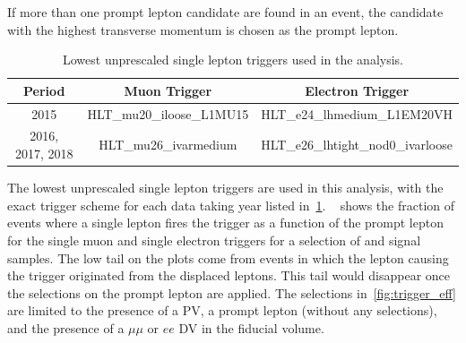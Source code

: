 \begin{table}[!ht]
    \centering
    \caption{Selections used for the prompt lepton candidate.}
    \label{tab:plep_selection}
\end{table}

If more than one prompt lepton candidate are found in an event, the candidate with the highest transverse momentum is chosen as the prompt lepton.

\begin{table}[!ht]
    \centering
    \begin{tabular}{ccc}
        \hline\hline
        Period & Muon Trigger & Electron Trigger \\
        \hline
        2015 & HLT\_mu20\_iloose\_L1MU15 & HLT\_e24\_lhmedium\_L1EM20VH \\
        2016, 2017, 2018 & HLT\_mu26\_ivarmedium & HLT\_e26\_lhtight\_nod0\_ivarloose \\
        \hline\hline
    \end{tabular}
    \caption{Lowest unprescaled single lepton triggers used in the analysis.}
    \label{tab:triggers}
\end{table}

The lowest unprescaled single lepton triggers are used in this analysis, with the exact trigger scheme for each data taking year listed in~\cref{tab:triggers}. ~ shows the fraction of events where a single lepton fires the trigger as a function of the prompt lepton \pT for the single muon and single electron triggers for a selection of \uuu and \eee signal samples. The low \pT tail on the plots come from events in which the lepton causing the trigger originated from the displaced leptons. This tail would disappear once the selections on the prompt lepton are applied. The selections in~\cref{fig:trigger_eff} are limited to the presence of a PV, a prompt lepton (without any selections), and the presence of a $\mu\mu$ or $ee$ DV in the fiducial volume.

